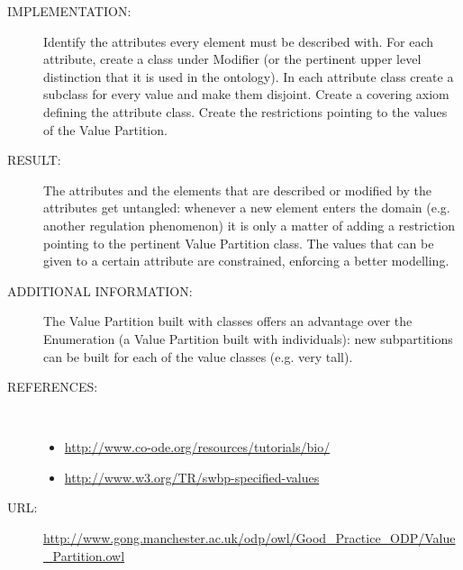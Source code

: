 \begin{description}
\item [IMPLEMENTATION:] Identify the attributes every element must be described with. For each attribute, create a class under Modifier (or the pertinent upper level distinction that it is used in the ontology). In each attribute class create a subclass for every value and make them disjoint. Create a covering axiom defining the attribute class. Create the restrictions pointing to the values of the Value Partition.

\item [RESULT:] The attributes and the elements that are described or modified by the attributes get untangled: whenever a new element enters the domain (e.g. another regulation phenomenon) it is only a matter of adding a restriction pointing to the pertinent Value Partition class. The values that can be given to a certain attribute are constrained, enforcing a better modelling.

\item [ADDITIONAL INFORMATION:] The Value Partition built with classes offers an advantage over the Enumeration (a Value Partition built with individuals): new subpartitions can be built for each of the value classes (e.g. very tall).

\item [REFERENCES: ] ~\begin{itemize}
\item \url{http://www.co-ode.org/resources/tutorials/bio/}
\item \url{http://www.w3.org/TR/swbp-specified-values}\end{itemize}
\item [URL: ] \url{http://www.gong.manchester.ac.uk/odp/owl/Good_Practice_ODP/Value_Partition.owl} \end{description}